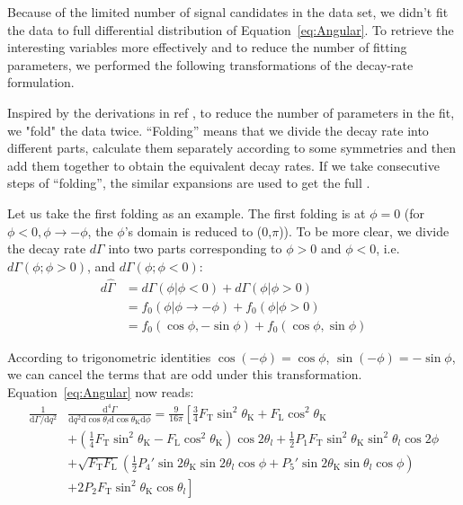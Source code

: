 Because of the limited number of signal candidates in the data set, we didn't fit the data to full differential distribution of Equation~\ref{eq:Angular}.
To retrieve the interesting variables more effectively and to reduce the number of fitting parameters, we performed the following transformations of the decay-rate formulation.

Inspired by the derivations in ref \cite{LHCb2}\cite{Matias2012}, to reduce the number of parameters in the fit, we "fold" the data twice.
``Folding'' means that we divide the decay rate into different parts, calculate them separately according to some symmetries and then add them together to obtain the equivalent decay rates.
If we take consecutive steps of ``folding'', the similar expansions are used to get the full \pdfs.

Let us take the first folding as an example.
The first folding is at $ \phi=0$ (for $\phi<0,\phi\rightarrow-\phi$, the $\phi$'s domain is reduced to (0,$\pi$)).
To be more clear, we divide the decay rate $d\Gamma$ into two parts corresponding to $\phi>0$ and $\phi<0$, i.e. $d\Gamma(\phi;\phi>0)$, and $d\Gamma(\phi;\phi<0)$:
\begin{equation} \label{eq:folding}
  \begin{split}
    d\hat{\Gamma} &= d\Gamma(\phi|\phi<0) + d\Gamma(\phi|\phi>0) \\
    & = f_0(\phi|\phi\rightarrow-\phi) + f_0(\phi|\phi>0) \\
    & = f_0(\cos\phi, -\sin\phi) + f_0(\cos\phi, \sin\phi)
  \end{split}
\end{equation}

According to trigonometric identities $\cos(-\phi) = \cos\phi $, $\sin(-\phi) = -\sin\phi $, we can cancel the terms that are odd under this transformation.
Equation~\ref{eq:Angular} now reads:
\begin{equation} \label{eq:fold1}
  \begin{split}
    \frac{1}{\mathrm{d}\Gamma/\mathrm{d}q^2}&\frac{\mathrm{d}^4\Gamma}{\mathrm{d}q^2 \mathrm{d}\cos\theta_l \mathrm{d}\cos\theta_\mathrm{K} \mathrm{d}\phi} = \frac{9}{16\pi}\left[\frac{3}{4}F_\mathrm{T}\sin^2\theta_\mathrm{K} + F_\mathrm{L}\cos^2\theta_\mathrm{K} \right.\\
      &\left.+(\frac{1}{4}F_\mathrm{T}\sin^2\theta_\mathrm{K}-F_\mathrm{L}\cos^2\theta_\mathrm{K})\cos2\theta_l+\frac{1}{2}P_1F_\mathrm{T}\sin^2\theta_\mathrm{K}\sin^2\theta_l\cos 2\phi \right.\\
      &+\sqrt{F_\mathrm{T}F_\mathrm{L}}(\frac{1}{2}P_4'\sin2\theta_\mathrm{K}\sin2\theta_l\cos\phi+P_5'\sin2\theta_\mathrm{K}\sin\theta_l\cos\phi )\\
      &\left.+2P_2F_\mathrm{T}\sin^2\theta_\mathrm{K}\cos\theta_l \right]
  \end{split}
\end{equation}


